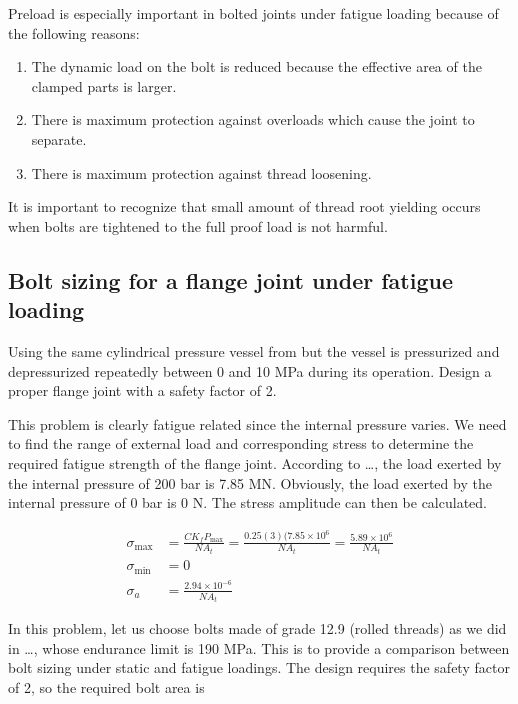 \documentclass[a4paper,openany,12pt]{book}
\begin{document}
{{Preload is especially important in bolted joints under fatigue loading
because of the following reasons:

\begin{enumerate}
\item The dynamic load on the bolt is reduced because the effective area of
the clamped parts is larger.

\item There is maximum protection against overloads which cause the joint
to separate.

\item There is maximum protection against thread loosening.
\end{enumerate}

It is important to recognize that small amount of thread root yielding
occurs when bolts are tightened to the full proof load is not harmful.

\subsection{Bolt sizing for a flange joint under fatigue loading}
\label{sec:org85740d8}

Using the same cylindrical pressure vessel from
but the vessel is pressurized and depressurized repeatedly between 0 and
10 MPa during its operation. Design a proper flange joint with a safety
factor of 2.

This problem is clearly fatigue related since the internal pressure
varies. We need to find the range of external load and corresponding
stress to determine the required fatigue strength of the flange joint.
According to \ldots{}, the load exerted by the internal pressure of 200 bar is 7.85 MN.
Obviously, the load exerted by the internal pressure of 0 bar is 0 N.
The stress amplitude can then be calculated.

$$\begin{aligned}
  \sigma_{\max } &= \frac{CK_fP_{\max}}{NA_t} = \frac{0.25(3)(7.85 \times 10^6}{NA_t} = \frac{5.89 \times 10^6}{NA_t} \\ 
  \sigma_{\min } &= 0 \\ 
  \sigma_a&= \frac{2.94 \times 10^{-6}}{NA_t} \end{aligned}$$

In this problem, let us choose bolts made of grade 12.9 (rolled threads)
as we did in \ldots{}, whose endurance limit is 190 MPa. This is to provide a comparison
between bolt sizing under static and fatigue loadings. The design
requires the safety factor of 2, so the required bolt area is

}}
\end{document}
